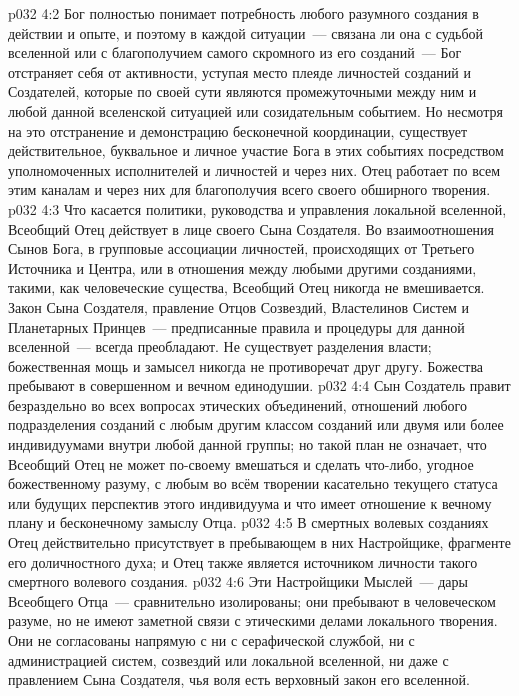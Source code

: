 \vs p032 4:2 Бог полностью понимает потребность любого разумного создания в действии и опыте, и поэтому в каждой ситуации~--- связана ли она с судьбой вселенной или с благополучием самого скромного из его созданий~--- Бог отстраняет себя от активности, уступая место плеяде личностей созданий и Создателей, которые по своей сути являются промежуточными между ним и любой данной вселенской ситуацией или созидательным событием. Но несмотря на это отстранение и демонстрацию бесконечной координации, существует действительное, буквальное и личное участие Бога в этих событиях посредством уполномоченных исполнителей и личностей и через них. Отец работает по всем этим каналам и через них для благополучия всего своего обширного творения.
\vs p032 4:3 \pc Что касается политики, руководства и управления локальной вселенной, Всеобщий Отец действует в лице своего Сына Создателя. Во взаимоотношения Сынов Бога, в групповые ассоциации личностей, происходящих от Третьего Источника и Центра, или в отношения между любыми другими созданиями, такими, как человеческие существа, Всеобщий Отец никогда не вмешивается. Закон Сына Создателя, правление Отцов Созвездий, Властелинов Систем и Планетарных Принцев~--- предписанные правила и процедуры для данной вселенной~--- всегда преобладают. Не существует разделения власти; божественная мощь и замысел никогда не противоречат друг другу. Божества пребывают в совершенном и вечном единодушии.
\vs p032 4:4 Сын Создатель правит безраздельно во всех вопросах этических объединений, отношений любого подразделения созданий с любым другим классом созданий или двумя или более индивидуумами внутри любой данной группы; но такой план не означает, что Всеобщий Отец не может по\hyp{}своему вмешаться и сделать что\hyp{}либо, угодное божественному разуму, с любым  во всём творении касательно текущего статуса или будущих перспектив этого индивидуума и что имеет отношение к вечному плану и бесконечному замыслу Отца.
\vs p032 4:5 \pc В смертных волевых созданиях Отец действительно присутствует в пребывающем в них Настройщике, фрагменте его доличностного духа; и Отец также является источником личности такого смертного волевого создания.
\vs p032 4:6 \pc Эти Настройщики Мыслей~--- дары Всеобщего Отца~--- сравнительно изолированы; они пребывают в человеческом разуме, но не имеют заметной связи с этическими делами локального творения. Они не согласованы напрямую с ни с серафической службой, ни с администрацией систем, созвездий или локальной вселенной, ни даже с правлением Сына Создателя, чья воля есть верховный закон его вселенной.

